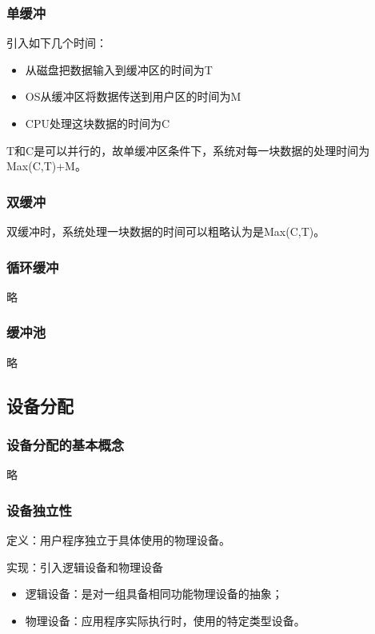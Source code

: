\documentclass[12pt, a4paper, oneside]{ctexart}
\begin{document}
\subsubsection{单缓冲}

引入如下几个时间：
\begin{itemize}
    \item 从磁盘把数据输入到缓冲区的时间为T
    \item OS从缓冲区将数据传送到用户区的时间为M
    \item CPU处理这块数据的时间为C
\end{itemize}

T和C是可以并行的，故单缓冲区条件下，系统对每一块数据的处理时间为Max(C,T)+M。

\subsubsection{双缓冲}

双缓冲时，系统处理一块数据的时间可以粗略认为是Max(C,T)。

\subsubsection{循环缓冲}

略

\subsubsection{缓冲池}

略

\subsection{设备分配}

\subsubsection{设备分配的基本概念}

略

\subsubsection{设备独立性}

定义：用户程序独立于具体使用的物理设备。

实现：引入逻辑设备和物理设备
\begin{itemize}
    \item 逻辑设备：是对一组具备相同功能物理设备的抽象；
    \item 物理设备：应用程序实际执行时，使用的特定类型设备。
\end{itemize}
\end{document}
